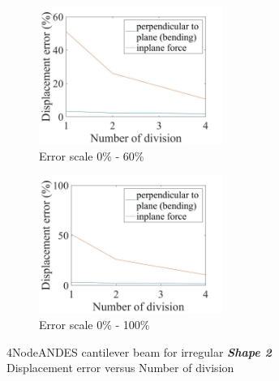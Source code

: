 \documentclass[fleqn,11pt]{article}
\begin{document}
\begin{figure}[H]
  \begin{subfigure}{0.5\textwidth}
    \centering
    \includegraphics[width=6cm]{../Figure-files/error4andes_beam_irregular_shape2.jpeg}
    \caption{Error scale 0\% - 60\%}
  \end{subfigure}
  \begin{subfigure}{0.5\textwidth}
    \centering
    \includegraphics[width=6cm]{../Figure-files/error4andes_beam_irregular_shape2100.jpeg}
    \caption{Error scale 0\% - 100\%}
  \end{subfigure}
  \captionsetup{justification=centering,margin=2cm}
  \caption{4NodeANDES cantilever beam for irregular \emph{\textbf{Shape 2}}\\
      Displacement error   versus   Number of division}
  \label{fig shape 2 4NodeANDES cantilever beam for irregular more elements}
\end{figure}

\end{document}
